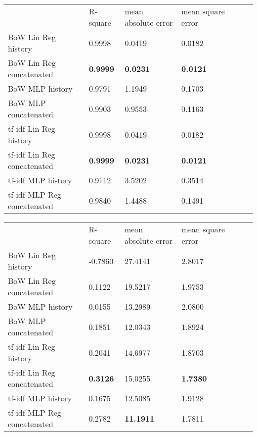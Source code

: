 \begin{tabular}{lllllll}
                            & R-square        & mean absolute error & mean square error \\
BoW Lin Reg history         & 0.9998          & 0.0419              & 0.0182            \\
BoW Lin Reg concatenated    & \textbf{0.9999} & \textbf{0.0231}     & \textbf{0.0121}   \\
BoW MLP history             & 0.9791          & 1.1949              & 0.1703            \\
BoW MLP concatenated        & 0.9903          & 0.9553              & 0.1163            \\
tf-idf Lin Reg history      & 0.9998          & 0.0419              & 0.0182            \\
tf-idf Lin Reg concatenated & \textbf{0.9999} & \textbf{0.0231}     & \textbf{0.0121}   \\
tf-idf MLP history          & 0.9112          & 3.5202              & 0.3514            \\
tf-idf MLP Reg concatenated & 0.9840          & 1.4488              & 0.1491
\end{tabular}

\begin{tabular}{lllllll}
                            & R-square        & mean absolute error & mean square error \\
BoW Lin Reg history         & -0.7860         & 27.4141             & 2.8017            \\
BoW Lin Reg concatenated    & 0.1122          & 19.5217             & 1.9753            \\
BoW MLP history             & 0.0155          & 13.2989             & 2.0800            \\
BoW MLP concatenated        & 0.1851          & 12.0343             & 1.8924            \\
tf-idf Lin Reg history      & 0.2041          & 14.6977             & 1.8703            \\
tf-idf Lin Reg concatenated & \textbf{0.3126} & 15.0255             & \textbf{1.7380}   \\
tf-idf MLP history          & 0.1675          & 12.5085             & 1.9128            \\
tf-idf MLP Reg concatenated & 0.2782          & \textbf{11.1911}    & 1.7811
\end{tabular}